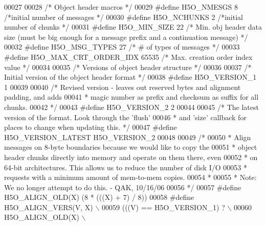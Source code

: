 \begin{DoxyCode}
00027 
00028 \textcolor{comment}{/* Object header macros */}
00029 \textcolor{preprocessor}{#define H5O\_NMESGS  8       }\textcolor{comment}{/*initial number of messages         */}\textcolor{preprocessor}{}
00030 \textcolor{preprocessor}{#define H5O\_NCHUNKS 2       }\textcolor{comment}{/*initial number of chunks       */}\textcolor{preprocessor}{}
00031 \textcolor{preprocessor}{#define H5O\_MIN\_SIZE    22      }\textcolor{comment}{/* Min. obj header data size (must be big enough for a message prefix and a
       continuation message) */}\textcolor{preprocessor}{}
00032 \textcolor{preprocessor}{#define H5O\_MSG\_TYPES   27              }\textcolor{comment}{/* # of types of messages            */}\textcolor{preprocessor}{}
00033 \textcolor{preprocessor}{#define H5O\_MAX\_CRT\_ORDER\_IDX 65535     }\textcolor{comment}{/* Max. creation order index value   */}\textcolor{preprocessor}{}
00034 
00035 \textcolor{comment}{/* Versions of object header structure */}
00036 
00037 \textcolor{comment}{/* Initial version of the object header format */}
00038 \textcolor{preprocessor}{#define H5O\_VERSION\_1       1}
00039 
00040 \textcolor{comment}{/* Revised version - leaves out reserved bytes and alignment padding, and adds}
00041 \textcolor{comment}{ *      magic number as prefix and checksum as suffix for all chunks.}
00042 \textcolor{comment}{ */}
00043 \textcolor{preprocessor}{#define H5O\_VERSION\_2       2}
00044 
00045 \textcolor{comment}{/* The latest version of the format.  Look through the 'flush'}
00046 \textcolor{comment}{ *      and 'size' callback for places to change when updating this. */}
00047 \textcolor{preprocessor}{#define H5O\_VERSION\_LATEST  H5O\_VERSION\_2}
00048 
00049 \textcolor{comment}{/*}
00050 \textcolor{comment}{ * Align messages on 8-byte boundaries because we would like to copy the}
00051 \textcolor{comment}{ * object header chunks directly into memory and operate on them there, even}
00052 \textcolor{comment}{ * on 64-bit architectures.  This allows us to reduce the number of disk I/O}
00053 \textcolor{comment}{ * requests with a minimum amount of mem-to-mem copies.}
00054 \textcolor{comment}{ *}
00055 \textcolor{comment}{ * Note: We no longer attempt to do this. - QAK, 10/16/06}
00056 \textcolor{comment}{ */}
00057 \textcolor{preprocessor}{#define H5O\_ALIGN\_OLD(X)    (8 * (((X) + 7) / 8))}
00058 \textcolor{preprocessor}{#define H5O\_ALIGN\_VERS(V, X)                              \(\backslash\)}
00059 \textcolor{preprocessor}{    (((V) == H5O\_VERSION\_1) ?                             \(\backslash\)}
00060 \textcolor{preprocessor}{        H5O\_ALIGN\_OLD(X)                          \(\backslash\)}

\end{DoxyCode}

